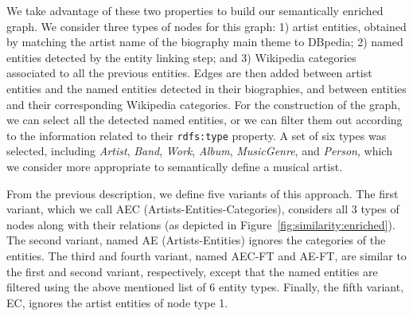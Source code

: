 We take advantage of these two properties to build our semantically enriched graph.
We consider three types of nodes for this graph: 1) artist entities, obtained by matching the artist name of the biography main theme to DBpedia; 2) named entities detected by the entity linking step; and 3) Wikipedia categories associated to all the previous entities.
Edges are then added between artist entities and the named entities detected in their biographies, and between entities and their corresponding Wikipedia categories.
For the construction of the graph, we can select all the detected named entities, or we can filter them out according to the information related to their \texttt{rdfs:type} property. A set of six types was selected, including \textit{Artist}, \textit{Band}, \textit{Work}, \textit{Album}, \textit{MusicGenre}, and \textit{Person}, which we consider more appropriate to semantically define a musical artist.

From the previous description, we define five variants of this approach. The first variant, which we call AEC (Artists-Entities-Categories), considers all 3 types of nodes along with their relations (as depicted in Figure~\ref{fig:similarity:enriched}). The second variant, named AE (Artists-Entities) ignores the categories of the entities. The third and fourth variant, named AEC-FT and AE-FT, are similar to the first and second variant, respectively, except that the named entities are filtered using the above mentioned list of 6 entity types. Finally, the fifth variant, EC, ignores the artist entities of node type 1.


%
%

